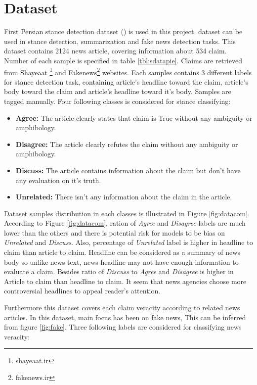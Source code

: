 \section{Dataset}
\label{sec:dataset}
First Persian stance detection dataset (\cite{stance_persian})  is used in this project. \cite{stance_persian} dataset can be used in stance detection, summarization and fake news detection tasks. This dataset contains 2124 news article, covering information about 534 claim. Number of each sample is specified in table \ref{tbl:sdatapie}. Claims are retrieved from Shayeaat \footnote{shayeaat.ir} and Fakenews\footnote{fakenews.ir} websites. Each samples contains 3 different labels for stance detection task, containing article's headline toward the claim, article's body toward the claim and article's headline toward it's body. Samples are tagged manually. Four following classes is considered for stance classifying:
\begin{itemize}
	\item {\color{green!70!black}\textbf{Agree:}} The article clearly states that claim is True without any ambiguity or amphibology. 
	\item {\color{red!70!black}\textbf{Disagree:}} The article clearly refutes the claim without any ambiguity or amphibology. 
	\item {\color{yellow!70!black}\textbf{Discuss:}} The article contains information about the claim but don't have any evaluation on it's truth. 
	\item {\color{gray!}\textbf{Unrelated:}} There isn't any information about the claim in the article.
\end{itemize}
Dataset samples distribution in each classes is illustrated in Figure \ref{fig:datacom}. According to Figure \ref{fig:datacom}, ration of \textit{Agree} and \textit{Disagree} labels are much lower than the others and there is potential risk for models to be bias on \textit{Unrelated} and \textit{Discuss}. Also, percentage of \textit{Unrelated} label is higher in headline to claim than article to claim. Headline can be considered as a summary of news body so unlike news text, news headline may not have enough information to evaluate a claim.  Besides ratio of \textit{Discuss} to \textit{Agree} and \textit{Disagree} is higher in Article to claim than headline to claim. It seem that news agencies choose more controversial headlines to appeal reader's attention.

Furthermore this dataset covers each claim veracity according to related news articles. In this dataset, main focus has been on fake news, This can be inferred from figure \ref{fig:fake}. Three following labels are considered for classifying news veracity:


